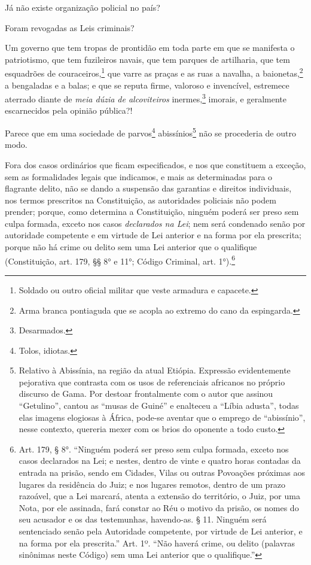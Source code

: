 Já não existe organização policial no país?

Foram revogadas as Leis criminais?

Um governo que tem tropas de prontidão em toda parte em que se manifesta
o patriotismo, que tem fuzileiros navais, que tem parques de artilharia,
que tem esquadrões de couraceiros,\footnote{Soldado ou outro oficial
  militar que veste armadura e capacete.} que varre as praças e as ruas
a navalha, a baionetas,\footnote{Arma branca pontiaguda que se acopla
  ao extremo do cano da espingarda.} a bengaladas e a balas; e que se
reputa firme, valoroso e invencível, estremece aterrado diante de
\emph{meia dúzia de alcoviteiros} inermes,\footnote{Desarmados.}
imorais, e geralmente escarnecidos pela opinião pública?!

Parece que em uma sociedade de parvos\footnote{Tolos, idiotas.}
abissínios\footnote{Relativo à Abissínia, na região da atual Etiópia.\label{abissinio}
  Expressão evidentemente pejorativa que contrasta com os usos de
  referenciais africanos no próprio discurso de Gama. Por destoar
  frontalmente com o autor que assinou ``Getulino'', cantou as ``musas de
  Guiné'' e enalteceu a ``Líbia adusta'', todas elas imagens elogiosas à
  África, pode-se aventar que o emprego de ``abissínio'', nesse contexto,
  quereria mexer com os brios do oponente a todo custo.} não se
procederia de outro modo.

Fora dos casos ordinários que ficam especificados, e nos que constituem
a exceção, sem as formalidades legais que indicamos, e mais as
determinadas para o flagrante delito, não se dando a suspensão das
garantias e direitos individuais, nos termos prescritos na Constituição,
as autoridades policiais não podem prender; porque, como determina a
Constituição, ninguém poderá ser preso sem culpa formada, exceto nos
casos \emph{declarados na Lei}; nem será condenado senão por autoridade
competente e em virtude de Lei anterior e na forma por ela prescrita;
porque não há crime ou delito sem uma Lei anterior que o qualifique
(Constituição, art. 179, §§ 8° e 11°; Código Criminal,
art. 1°).\footnote{Art. 179, § 8°. ``Ninguém poderá ser preso sem culpa
  formada, exceto nos casos declarados na Lei; e nestes, dentro de vinte
  e quatro horas contadas da entrada na prisão, sendo em Cidades, Vilas
  ou outras Povoações próximas aos lugares da residência do Juiz; e nos
  lugares remotos, dentro de um prazo razoável, que a Lei marcará,
  atenta a extensão do território, o Juiz, por uma Nota, por ele
  assinada, fará constar ao Réu o motivo da prisão, os nomes do seu
  acusador e os das testemunhas, havendo-as.
  § 11. Ninguém será sentenciado senão pela Autoridade competente, por
  virtude de Lei anterior, e na forma por ela prescrita.''
  Art. 1º. ``Não haverá crime, ou delito (palavras sinônimas neste
  Código) sem uma Lei anterior que o qualifique.''}

